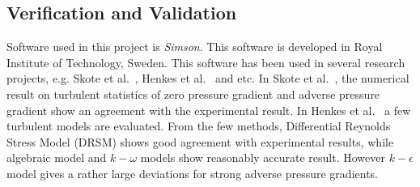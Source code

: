 \subsection{Verification and Validation}
Software used in this project is \emph{Simson}. This software is developed in Royal Institute of Technology, Sweden. This software has been used in several research projects, e.g. Skote et al.~\cite{skote-1}, Henkes et al.~\cite{skote-2} and etc. In Skote et al.~\cite{skote-1}, the numerical result on turbulent statistics of zero pressure gradient and adverse pressure gradient show an agreement with the experimental result. In Henkes et al.~\cite{skote-2} a few turbulent models are evaluated. From the few methods, Differential Reynolds Stress Model (DRSM) shows good agreement with experimental results, while algebraic model and $k-\omega$ models show reasonably accurate result. However $k-\epsilon$ model gives a rather large deviations for strong adverse pressure gradients. 